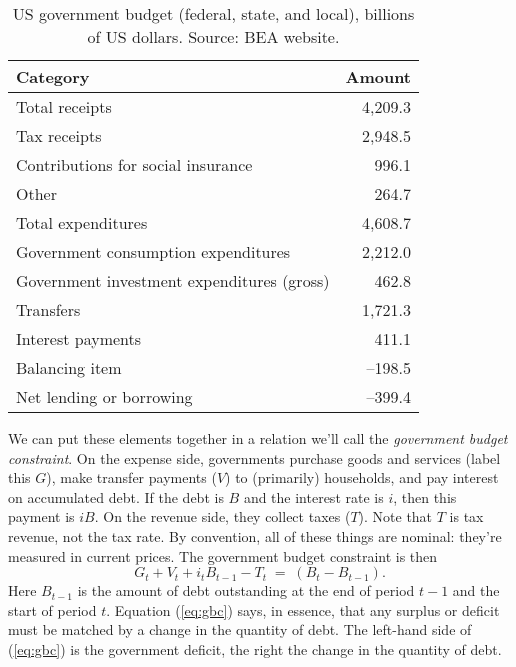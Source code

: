 \documentclass[letterpaper,12pt]{article}
\newcommand{\hsp}{\hspace{0.25in}}
\begin{document}
\begin{table}[h]
\centering \tabcolsep=0.2in
\begin{tabular}{lr}
\hline\hline Category  &  Amount \\
\hline\hline

{Total receipts}        &      4,209.3 \\
\hsp Tax receipts              &      2,948.5     \\
\hsp Contributions for social insurance        &   996.1     \\
\hsp Other              &          264.7      \\

\hline

{Total expenditures}    &    4,608.7    \\
\hsp Government consumption expenditures    &   2,212.0          \\
\hsp Government investment expenditures (gross)   &    462.8     \\
\hsp Transfers            &       1,721.3        \\
\hsp Interest payments             &    411.1            \\
\hsp Balancing item              &       --198.5     \\

\hline

Net lending or borrowing   &     --399.4  \\

\hline\hline
\end{tabular}
\caption{US government budget (federal, state, and local), 
billions of US dollars.  Source:  BEA website.}
\label{tab:usdef}
\end{table}

We can put these elements together in a relation we'll call 
the {\it government budget constraint\/}.
On the expense side, governments purchase goods and services 
(label this $G$), make transfer payments ($V$) to (primarily) households, 
and pay interest on accumulated debt.
If the debt is $B$ and the interest rate is $i$, then this payment 
is $iB$.
On the revenue side, they collect taxes ($T$).
Note that $T$ is tax revenue, not the tax rate.
By convention, all of these things are nominal:
they're measured in current prices.  
The government budget constraint is then 
\begin{equation}
    G_t + V_t + i_t B_{t-1} - T_t  \;=\; (B_{t} - B_{t-1} ) .
    \label{eq:gbc}
\end{equation}
Here $B_{t-1}$ is the amount of debt outstanding at the end of
period $t-1$ and the start of period $t$.  
Equation (\ref{eq:gbc}) says, in essence, that any surplus or deficit must be matched
by a change in the quantity of debt.
The left-hand side of (\ref{eq:gbc}) 
is the government deficit, 
the right the change in the quantity of debt.
\end{document}
